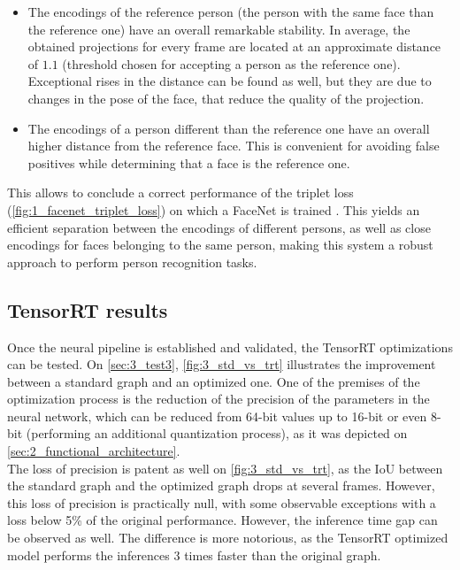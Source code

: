 \begin{itemize}
	\item The encodings of the reference person (the person with the same face than the reference one) have an overall remarkable stability. In average, the obtained projections for every frame are located at an approximate distance of $1.1$ (threshold chosen for accepting a person as the reference one). Exceptional rises in the distance can be found as well, but they are due to changes in the pose of the face, that reduce the quality of the projection.\\
	\item The encodings of a person different than the reference one have an overall higher distance from the reference face. This is convenient for avoiding false positives while determining that a face is the reference one.
\end{itemize} 

This allows to conclude a correct performance of the triplet loss (\autoref{fig:1_facenet_triplet_loss}) on which a FaceNet is trained \cite{facenet}. This yields an efficient separation between the encodings of different persons, as well as close encodings for faces belonging to the same person, making this system a robust approach to perform person recognition tasks.\\


\subsection{TensorRT results}

Once the neural pipeline is established and validated, the TensorRT optimizations can be tested. On \autoref{sec:3_test3}, \autoref{fig:3_std_vs_trt} illustrates the improvement between a standard graph and an optimized one. One of the premises of the optimization process is the reduction of the precision of the parameters in the neural network, which can be reduced from 64-bit values up to 16-bit or even 8-bit (performing an additional quantization process), as it was depicted on \autoref{sec:2_functional_architecture}.\\

The loss of precision is patent as well on \autoref{fig:3_std_vs_trt}, as the IoU between the standard graph and the optimized graph drops at several frames. However, this loss of precision is practically null, with some observable exceptions with a loss below 5\% of the original performance. However, the inference time gap can be observed as well. The difference is more notorious, as the TensorRT optimized model performs the inferences 3 times faster than the original graph.\\

